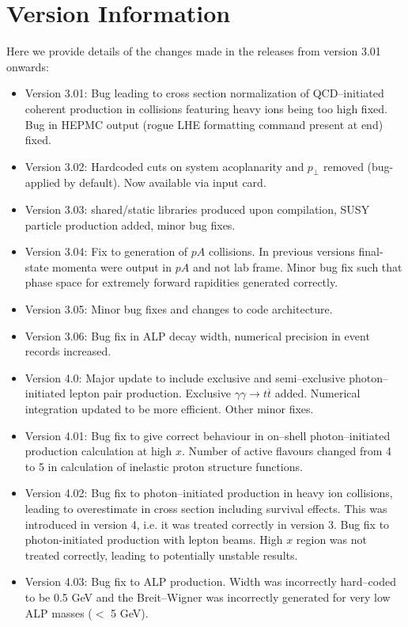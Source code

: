 \documentclass[12pt]{article}
\begin{document}
\section{Version Information}

Here we provide details of the changes made in the releases from version 3.01 onwards:

\begin{itemize}

\item Version 3.01: Bug leading to cross section normalization of QCD--initiated coherent production in collisions featuring heavy ions being too high fixed. Bug in HEPMC output (rogue LHE formatting command present at end) fixed.
\item Version 3.02: Hardcoded cuts on system acoplanarity and $p_\perp$ removed (bug- applied by default). Now available via input card.
\item Version 3.03: shared/static libraries produced upon compilation, SUSY particle production added, minor bug fixes.
\item Version 3.04: Fix to generation of $pA$ collisions. In previous versions final-state momenta were output in $pA$ and not lab frame. Minor bug fix such that phase space for extremely forward rapidities generated correctly.
\item Version 3.05: Minor bug fixes and changes to code architecture.
\item Version 3.06: Bug fix in ALP decay width, numerical precision in event records increased.
\item Version 4.0: Major update to include exclusive and semi--exclusive photon--initiated lepton pair production. Exclusive $\gamma\gamma \to t\overline{t}$ added. Numerical integration updated to be more efficient. Other minor fixes.
\item Version 4.01: Bug fix to give correct behaviour in on--shell photon--initiated production calculation at high $x$. Number of active flavours changed from 4 to 5 in calculation of inelastic proton structure functions.
\item Version 4.02: Bug fix to photon--initiated production in heavy ion collisions, leading to overestimate in cross section including survival effects. This was introduced in version 4, i.e. it was treated correctly in version 3. Bug fix to photon-initiated production with lepton beams. High $x$ region was not treated correctly, leading to potentially unstable results.
\item Version 4.03: Bug fix to ALP production. Width was incorrectly hard--coded to be 0.5 GeV and the Breit--Wigner was incorrectly generated for very low ALP masses ($<$ 5 GeV).

\end{itemize}
\end{document}
